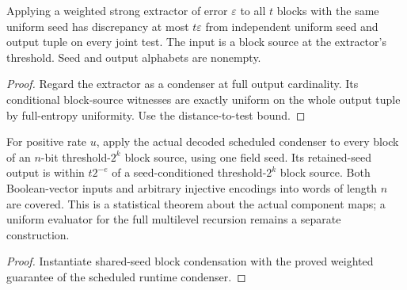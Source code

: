 \begin{theorem}
  \label{thm:lowerbounds-algebraic-block-extractor}
  \leanok
  Applying a weighted strong extractor of error $\varepsilon$ to all $t$
  blocks with the same uniform seed has discrepancy at most $t\varepsilon$
  from independent uniform seed and output tuple on every joint test.
  The input is a block source at the extractor's threshold. Seed and output
  alphabets are nonempty.
\end{theorem}
\begin{proof}
  \leanok
  Regard the extractor as a condenser at full output cardinality. Its
  conditional block-source witnesses are exactly uniform on the whole
  output tuple by full-entropy uniformity. Use the distance-to-test bound.
\end{proof}

\begin{theorem}
  \label{thm:lowerbounds-algebraic-explicit-block-condenser}
  \leanok
  For positive rate $u$, apply the actual decoded scheduled condenser to
  every block of an $n$-bit threshold-$2^k$ block source, using one field
  seed. Its retained-seed output is within $t2^{-e}$ of a seed-conditioned
  threshold-$2^k$ block source. Both Boolean-vector inputs and arbitrary
  injective encodings into words of length $n$ are covered. This is a
  statistical theorem about the actual component maps; a uniform evaluator
  for the full multilevel recursion remains a separate construction.
\end{theorem}
\begin{proof}
  \leanok
  Instantiate shared-seed block condensation with the proved weighted
  guarantee of the scheduled runtime condenser.
\end{proof}


